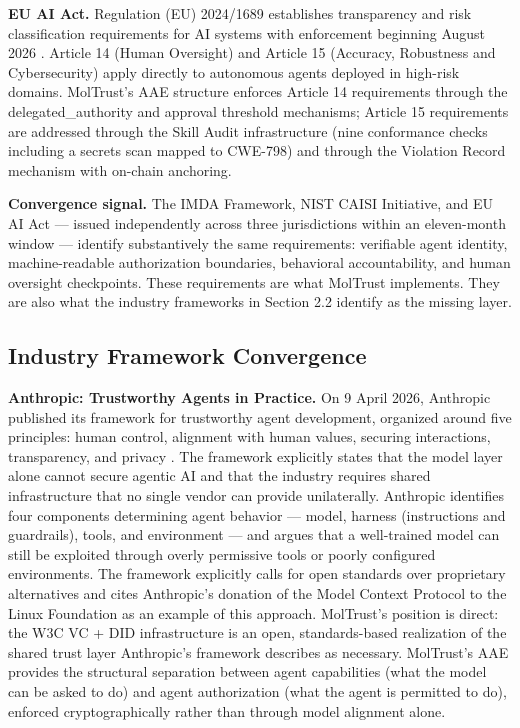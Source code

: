\textbf{EU AI Act.} Regulation (EU) 2024/1689 establishes transparency and risk classification requirements for AI systems with enforcement beginning August 2026 \cite{ref23_euaiact}. Article 14 (Human Oversight) and Article 15 (Accuracy, Robustness and Cybersecurity) apply directly to autonomous agents deployed in high-risk domains. MolTrust's AAE structure enforces Article 14 requirements through the delegated\_authority and approval threshold mechanisms; Article 15 requirements are addressed through the Skill Audit infrastructure (nine conformance checks including a secrets scan mapped to CWE-798) and through the Violation Record mechanism with on-chain anchoring.


\textbf{Convergence signal.} The IMDA Framework, NIST CAISI Initiative, and EU AI Act — issued independently across three jurisdictions within an eleven-month window — identify substantively the same requirements: verifiable agent identity, machine-readable authorization boundaries, behavioral accountability, and human oversight checkpoints. These requirements are what MolTrust implements. They are also what the industry frameworks in Section 2.2 identify as the missing layer.


\subsection{Industry Framework Convergence}

\textbf{Anthropic: Trustworthy Agents in Practice.} On 9 April 2026, Anthropic published its framework for trustworthy agent development, organized around five principles: human control, alignment with human values, securing interactions, transparency, and privacy \cite{ref11_anthropic}. The framework explicitly states that the model layer alone cannot secure agentic AI and that the industry requires shared infrastructure that no single vendor can provide unilaterally. Anthropic identifies four components determining agent behavior — model, harness (instructions and guardrails), tools, and environment — and argues that a well-trained model can still be exploited through overly permissive tools or poorly configured environments. The framework explicitly calls for open standards over proprietary alternatives and cites Anthropic's donation of the Model Context Protocol to the Linux Foundation as an example of this approach. MolTrust's position is direct: the W3C VC + DID infrastructure is an open, standards-based realization of the shared trust layer Anthropic's framework describes as necessary. MolTrust's AAE provides the structural separation between agent capabilities (what the model can be asked to do) and agent authorization (what the agent is permitted to do), enforced cryptographically rather than through model alignment alone.


